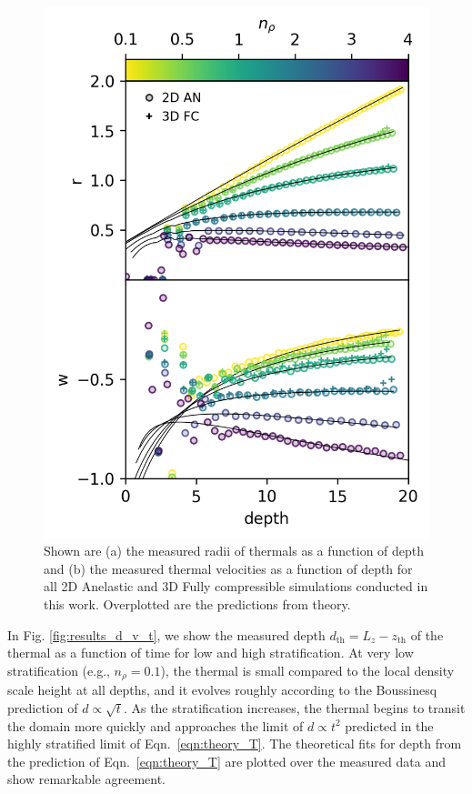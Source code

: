 \documentclass[twocolumn, amsmath, amsfonts, amssymb, trackchanges]{aastex62}
\begin{document}
\begin{figure}[t!]
    \includegraphics[width=\columnwidth]{results_panels_vs_depth.png}
    \caption{Shown are (a) the measured radii of thermals as a function of depth and
	(b) the measured thermal velocities as a function of depth for all 2D
	Anelastic and 3D Fully compressible simulations conducted in this work. Overplotted
	are the predictions from theory.
    \label{fig:results_vs_depth} }
\end{figure}

In Fig. \ref{fig:results_d_v_t}, we show the measured depth $d_{\text{th}} = L_z - z_{\text{th}}$
of the thermal as a function of time for low and high stratification. 
At very low stratification
(e.g., $n_\rho = 0.1$), the thermal is small compared to the local density scale height at all depths,
and it evolves roughly according to the Boussinesq prediction of $d \propto \sqrt{t}$. As the stratification
increases, 
the thermal begins to transit the domain more quickly and approaches the limit of 
$d \propto t^2$ predicted in the highly stratified limit of Eqn.~\ref{eqn:theory_T}. The
theoretical fits for depth from the prediction of Eqn.~\ref{eqn:theory_T} are plotted over
the measured data and show remarkable agreement.
\end{document}
